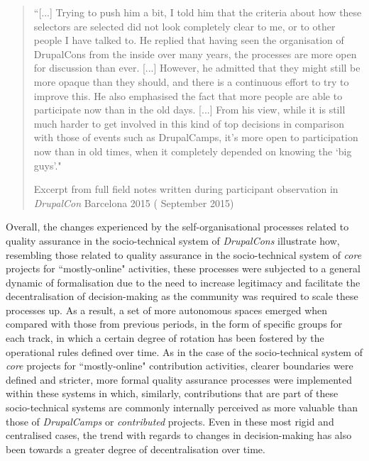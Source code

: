 \begin{quotation}
``[...] Trying to push him a bit, I told him that the criteria about how these selectors are selected did not look completely clear to me, or to other people I have talked to. He replied that having seen the organisation of DrupalCons from the inside over many years, the processes are more open for discussion than ever. [...] However, he admitted that they might still be more opaque than they should, and there is a continuous effort to try to improve this. He also emphasised the fact that more people are able to participate now than in the old days. [...] From his view, while it is still much harder to get involved in this kind of top decisions in comparison with those of events such as DrupalCamps, it's more open to participation now than in old times, when it completely depended on knowing the `big guys'."

\begin{flushright}\footnotesize{Excerpt from full field notes written during participant observation in \textit{DrupalCon} Barcelona 2015 ( September 2015)}\end{flushright}
\end{quotation}

Overall, the changes experienced by the self-organisational processes related to quality assurance in the socio-technical system of \textit{DrupalCons} illustrate how, resembling those related to quality assurance in the socio-technical system of \textit{core} projects for ``mostly-online" activities, these processes were subjected to a general dynamic of formalisation due to the need to increase legitimacy and facilitate the decentralisation of decision-making as the community was required to scale these processes up. As a result, a set of more autonomous spaces emerged when compared with those from previous periods, in the form of specific groups for each track, in which a certain degree of rotation has been fostered by the operational rules defined over time. As in the case of the socio-technical system of \textit{core} projects for ``mostly-online" contribution activities, clearer boundaries were defined and stricter, more formal quality assurance processes were implemented within these systems in which, similarly, contributions that are part of these socio-technical systems are commonly internally perceived as more valuable than those of \textit{DrupalCamps} or \textit{contributed} projects. Even in these most rigid and centralised cases, the trend with regards to changes in decision-making has also been towards a greater degree of decentralisation over time.

